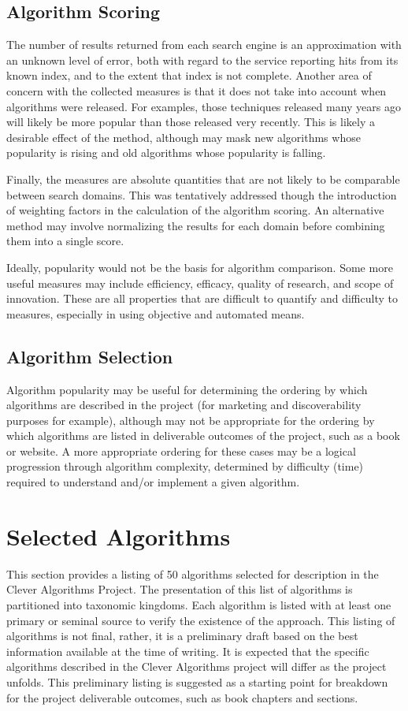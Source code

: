 \documentclass[a4paper, 11pt]{article}
\begin{document}
\subsection{Algorithm Scoring}
The number of results returned from each search engine is an approximation with an unknown level of error, both with regard to the service reporting hits from its known index, and to the extent that index is not complete. Another area of concern with the collected measures is that it does not take into account when algorithms were released. For examples, those techniques released many years ago will likely be more popular than those released very recently. This is likely a desirable effect of the method, although may mask new algorithms whose popularity is rising and old algorithms whose popularity is falling. 

Finally, the measures are absolute quantities that are not likely to be comparable between search domains. This was tentatively addressed though the introduction of weighting factors in the calculation of the algorithm scoring. An alternative method may involve normalizing the results for each domain before combining them into a single score.

Ideally, popularity would not be the basis for algorithm comparison. Some more useful measures may include efficiency, efficacy, quality of research, and scope of innovation. These are all properties that are difficult to quantify and difficulty to measures, especially in using objective and automated means.  

\subsection{Algorithm Selection}
Algorithm popularity may be useful for determining the ordering by which algorithms are described in the project (for marketing and discoverability purposes for example), although may not be appropriate for the ordering by which algorithms are listed in deliverable outcomes of the project, such as a book or website. A more appropriate ordering for these cases may be a logical progression through algorithm complexity, determined by difficulty (time) required to understand and/or implement a given algorithm.  

% 
% 
\section{Selected Algorithms}
\label{sec:selection}
This section provides a listing of 50 algorithms selected for description in the Clever Algorithms Project. The presentation of this list of algorithms is partitioned into taxonomic kingdoms. Each algorithm is listed with at least one primary or seminal source to verify the existence of the approach. This listing of algorithms is not final, rather, it is a preliminary draft based on the best information available at the time of writing. It is expected that the specific algorithms described in the Clever Algorithms project will differ as the project unfolds. This preliminary listing is suggested as a starting point for breakdown for the project deliverable outcomes, such as book chapters and sections.
\end{document}
